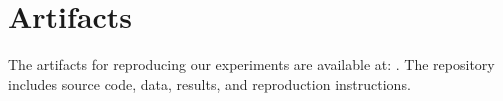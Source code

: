 \documentclass[sigconf]{acmart}
\begin{document}



\section*{Artifacts}
The artifacts for reproducing our experiments are available at:
\href{https://github.com/Dadams2/query-data-predictor/tree/EDBT_2027}{\allowbreak{}}.
The repository includes source code, data, results, and reproduction instructions.

\balance


\end{document}
